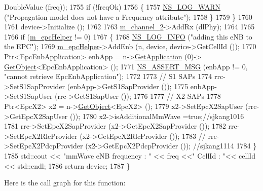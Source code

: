\begin{DoxyCode}
      DoubleValue (freq));
1755                 \textcolor{keywordflow}{if} (!freqOk)
1756                 \{
1757                         \hyperlink{group__logging_gade7208b4009cdf0e25783cd26766f559}{NS\_LOG\_WARN} (\textcolor{stringliteral}{"Propagation model does not have a Frequency attribute"});
1758                 \}
1759         \}
1760 
1761         device->Initialize ();
1762 
1763         \hyperlink{classns3_1_1MmWaveHelper_af0230ef91f1c4defe2a316f5de3ff209}{m\_channel\_2}->AddRx (dlPhy);
1764 
1765 
1766         \textcolor{keywordflow}{if} (\hyperlink{classns3_1_1MmWaveHelper_a03b33f9a2480a4cdd8ffe697ccc08e9e}{m\_epcHelper} != 0)
1767         \{
1768                 \hyperlink{group__logging_gafbd73ee2cf9f26b319f49086d8e860fb}{NS\_LOG\_INFO} (\textcolor{stringliteral}{"adding this eNB to the EPC"});
1769                 \hyperlink{classns3_1_1MmWaveHelper_a03b33f9a2480a4cdd8ffe697ccc08e9e}{m\_epcHelper}->AddEnb (n, device, device->GetCellId ());
1770                 Ptr<EpcEnbApplication> enbApp = n->\hyperlink{classns3_1_1Node_ad0ab54d76712398c0a8e25d9ac59ea41}{GetApplication} (0)->
      \hyperlink{classns3_1_1Object_a13e18c00017096c8381eb651d5bd0783}{GetObject}<EpcEnbApplication> ();
1771                 \hyperlink{assert_8h_aff5ece9066c74e681e74999856f08539}{NS\_ASSERT\_MSG} (enbApp != 0, \textcolor{stringliteral}{"cannot retrieve EpcEnbApplication"});
1772 
1773                 \textcolor{comment}{// S1 SAPs}
1774                 rrc->SetS1SapProvider (enbApp->GetS1SapProvider ());
1775                 enbApp->SetS1SapUser (rrc->GetS1SapUser ());
1776 
1777                 \textcolor{comment}{// X2 SAPs}
1778                 Ptr<EpcX2> x2 = n->\hyperlink{classns3_1_1Object_a13e18c00017096c8381eb651d5bd0783}{GetObject}<EpcX2> ();
1779                 x2->SetEpcX2SapUser (rrc->GetEpcX2SapUser ());
1780         x2->isAdditionalMmWave =\textcolor{keyword}{true};\textcolor{comment}{//sjkang1016}
1781                 rrc->SetEpcX2SapProvider (x2->GetEpcX2SapProvider ());
1782                 rrc->SetEpcX2RlcProvider (x2->GetEpcX2RlcProvider ());
1783          \textcolor{comment}{//      rrc->SetEpcX2PdcpProvider (x2->GetEpcX2PdcpProvider ()); //sjkang1114}
1784         \}
1785         std::cout << \textcolor{stringliteral}{"mmWave eNB frequency : "} << freq <<\textcolor{stringliteral}{" CellId : "}<< cellId << std::endl;
1786         \textcolor{keywordflow}{return} device;
1787 \}
\end{DoxyCode}


Here is the call graph for this function\+:




